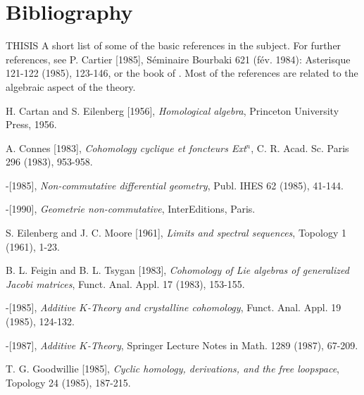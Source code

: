 \backmatter

\chapter{Bibliography}

THIS\pageoriginale IS A short list of some of the basic references in
the subject. For further references, see P. Cartier [1985],
S\'eminaire Bourbaki 621 (f\'ev. 1984): Asterisque 121-122 (1985),
123-146, or the book of \cite{Connes1990}. Most of the references are
related to the algebraic aspect of the theory.


\begin{thebibliography}{99}
  H. Cartan and S. Eilenberg [1956], {\em Homological
  algebra}, Princeton University Press, 1956.

  A. Connes [1983], {\em Cohomology cyclique et foncteurs 
  Ext$^{n}$}, C. R. Acad. Sc. Paris 296 (1983), 953-958.


\quad-[1985], {\em Non-commutative differential geometry}, Publ. IHES 62
(1985), 41-144.

\quad-[1990], {\em Geometrie non-commutative}, InterEditions, Paris.

S. Eilenberg and J. C. Moore
  [1961], {\em Limits and 
  spectral sequences}, Topology 1 (1961), 1-23.

    B. L. Feigin and B. L. Tsygan
  [1983], {\em Cohomology 
  of Lie algebras of generalized Jacobi matrices},
  Funct. Anal. Appl. 17 (1983), 153-155.

\quad-[1985], {\em Additive $K$-Theory and crystalline cohomology},
Funct. Anal. Appl. 19 (1985), 124-132.

\quad-[1987], {\em Additive $K$-Theory}, Springer Lecture Notes in
Math. 1289 (1987), 67-209.

  T. G. Goodwillie [1985], {\em Cyclic homology,
  derivations, and the free loopspace}, Topology 24 (1985), 187-215.


\end{thebibliography}
